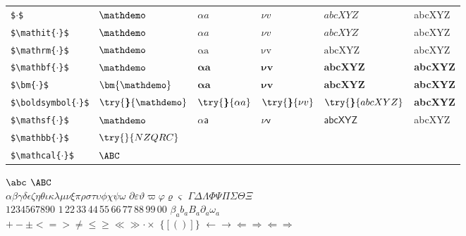 \begin{tabular}{@{}llllll}
\texttt{\$$\cdot$\$} & $\mathdemo$ & $\alpha a$ & $\nu v$ & $abcXYZ$ & abcXYZ \\
\texttt{\$\textbackslash mathit\{$\cdot$\}\$} & $\mathit{\mathdemo}$ & $\mathit{\alpha a}$ & $\mathit{\nu v}$ & $\mathit{abcXYZ}$ & abcXYZ \\
\texttt{\$\textbackslash mathrm\{$\cdot$\}\$} & $\mathrm{\mathdemo}$ & $\mathrm{\alpha a}$ & $\mathrm{\nu v}$ & $\mathrm{abcXYZ}$ & abcXYZ \\
\texttt{\$\textbackslash mathbf\{$\cdot$\}\$} & $\mathbf{\mathdemo}$ & $\mathbf{\alpha a}$ & $\mathbf{\nu v}$ & $\mathbf{abcXYZ}$ & \textbf{abcXYZ} \\
\texttt{\$\textbackslash bm\{$\cdot$\}\$} & $\bm{\mathdemo}$ & $\bm{\alpha a}$ & $\bm{\nu v}$ & $\bm{abcXYZ}$ & \textbf{abcXYZ} \\
\texttt{\$\textbackslash boldsymbol\{$\cdot$\}\$} & $\try{\boldsymbol}{\mathdemo}$ & $\try{\boldsymbol}{\alpha a}$ & $\try{\boldsymbol}{\nu v}$ & $\try{\boldsymbol}{abcXYZ}$ & \textbf{abcXYZ} \\
\texttt{\$\textbackslash mathsf\{$\cdot$\}\$} & $\mathsf{\mathdemo}$ & $\mathsf{\alpha a}$ & $\mathsf{\nu v}$ & $\mathsf{abcXYZ}$ & abcXYZ \\
\texttt{\$\textbackslash mathbb\{$\cdot$\}\$} & \multicolumn{5}{l}{$\try{\mathbb}{NZQRC}$} \\
\texttt{\$\textbackslash mathcal\{$\cdot$\}\$} & \multicolumn{5}{l}{$\mathcal{\ABC}$} \\
\end{tabular}

\bigskip
\noindent
$\abc$ \qquad $\ABC$\\
$\alpha\beta\gamma\delta\epsilon\zeta\eta\theta\iota\kappa\lambda\mu\nu\xi\pi\rho\sigma\tau\upsilon\phi\chi\psi\omega$ \qquad
$\partial\varepsilon\vartheta\varpi\varphi\varrho\varsigma$ \qquad
$\Gamma\Delta\Lambda\Phi\Psi\Pi\Sigma\Theta\Xi$\\
$1234567890$ $1$\,2$2$\,3$3$\,4$4$\,5$5$\,6$6$\,7$7$\,8$8$\,9$9$\,0$0$ \qquad
$\beta_a b_a B_a \partial_a \omega_a$ \\
$+ - \pm <=> \ne \le \ge \ll \gg \cdot \times$ \qquad
$\{[()]\}$ \qquad
$\leftarrow \rightarrow \Leftarrow \Rightarrow \Longleftarrow \Longrightarrow$
